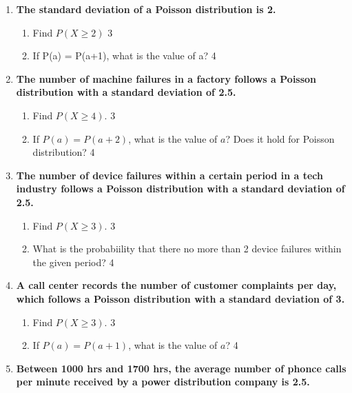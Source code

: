 \documentclass[a4paper,oneside, margin=1.4in]{book}
\begin{document}
\begin{enumerate}

 \item
	  \textbf{The standard deviation of a Poisson distribution is 2.} 
  
  \begin{enumerate}
    \item  
	Find $P(X\ge 2)$ \hfill 3
    \item
	If P(a) = P(a+1), what is the value of a? \hfill 4
  \end{enumerate}
  
  \item  
  \textbf{The number of machine failures in a factory follows a Poisson distribution with a standard deviation of 2.5.}  

  \begin{enumerate}  
    \item  
      Find $P(X \geq 4)$. \hfill 3  
    \item  
      If $P(a) = P(a+2)$, what is the value of $a$? Does it hold for Poisson distribution?  \hfill 4  
  \end{enumerate}  
  
    \item  
  \textbf{The number of device failures within a certain period in a tech industry follows a Poisson distribution with a standard deviation of 2.5.}  

  \begin{enumerate}  
    \item  
      Find $P(X \geq 3)$. \hfill 3  
    \item  
      What is the probabiility that there no more than 2 device failures within the given period?  \hfill 4  
  \end{enumerate}   

\item  
  \textbf{A call center records the number of customer complaints per day, which follows a Poisson distribution with a standard deviation of 3.}  

  \begin{enumerate}  
    \item  
      Find $P(X \geq 3)$. \hfill 3  
    \item  
      If $P(a) = P(a+1)$, what is the value of $a$? \hfill 4  
  \end{enumerate}  


   \item
	  \textbf{Between 1000 hrs and 1700 hrs, the average number of phonce calls per minute received by a power distribution company is 2.5. } 
  

\end{enumerate}
\end{document}
